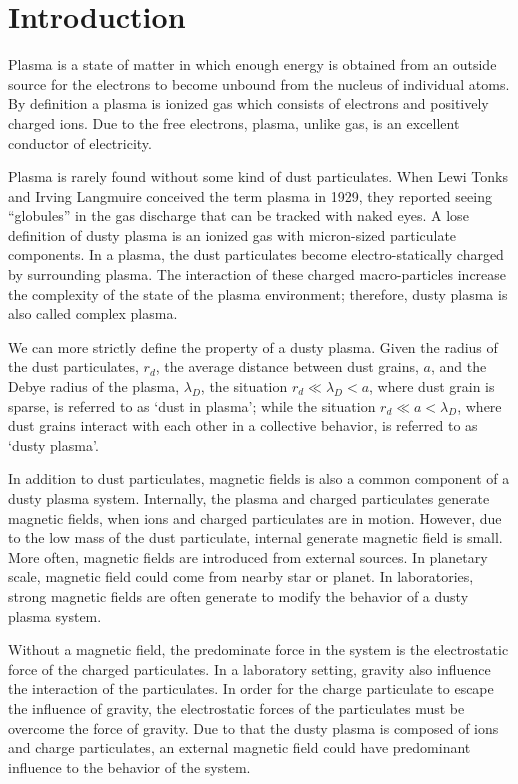 \section{Introduction}

Plasma is a state of matter in which enough energy is obtained from an outside source for the electrons to become unbound from the nucleus of individual atoms. By definition a plasma is ionized gas which consists of electrons and positively charged ions. Due to the free electrons, plasma, unlike gas, is an excellent conductor of electricity.

Plasma is rarely found without some kind of dust particulates. When Lewi Tonks and Irving Langmuire conceived the term plasma in 1929, they reported seeing ``globules'' in the gas discharge that can be tracked with naked eyes\cite{thomas2013, tonks1929oscillations}. A lose definition of dusty plasma is an ionized gas with micron-sized particulate components. In a plasma, the dust particulates become electro-statically charged by surrounding plasma. The interaction of these charged macro-particles increase the complexity of the state of the plasma environment; therefore, dusty plasma is also called complex plasma.

We can more strictly define the property of a dusty plasma. Given the radius of the dust particulates, $r_d$, the average distance between dust grains, $a$, and the Debye radius of the plasma, $\lambda_D$, the situation $r_d \ll \lambda_D < a$, where dust grain is sparse, is referred to as `dust in plasma'; while the situation $r_d \ll a < \lambda_D$, where dust grains interact with each other in a collective behavior, is referred to as `dusty plasma'\cite{shukla2010introduction}.

In addition to dust particulates, magnetic fields is also a common component of a dusty plasma system. Internally, the plasma and charged particulates generate magnetic fields, when ions and charged particulates are in motion. However, due to the low mass of the dust particulate, internal generate magnetic field is small. More often, magnetic fields are introduced from external sources. In planetary scale, magnetic field could come from nearby star or planet. In laboratories, strong magnetic fields are often generate to modify the behavior of a dusty plasma system.

Without a magnetic field, the predominate force in the system is the electrostatic force of the charged particulates. In a laboratory setting, gravity also influence the interaction of the particulates. In order for the charge particulate to escape the influence of gravity, the electrostatic forces of the particulates must be overcome the force of gravity. Due to that the dusty plasma is composed of ions and charge particulates, an external magnetic field could have predominant influence to the behavior of the system.

